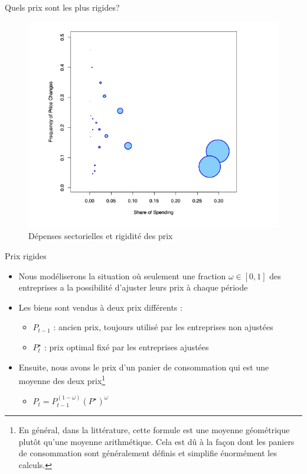 \documentclass[
  ignorenonframetext,
  aspectratio=169,
]{beamer}
\providecommand{\tightlist}{%
  \setlength{\itemsep}{0pt}\setlength{\parskip}{0pt}}\usepackage{longtable,booktabs,array}
\begin{document}
\begin{frame}{Quels prix sont les plus rigides?}
\label{quels-prix-sont-les-plus-rigides}
\begin{figure}[H]

{\centering \includegraphics[width=\textwidth,height=0.8\textheight]{assets/sectoral_spending.png}

}

\caption{Dépenses sectorielles et rigidité des prix}

\end{figure}%
\end{frame}

\begin{frame}{Prix rigides}
\label{prix-rigides-2}
\begin{itemize}
\item
  Nous modéliserons la situation où seulement une fraction
  \(\omega \in [0,1]\) des entreprises a la possibilité d'ajuster leurs
  prix à chaque période
\item
  Les biens sont vendus à deux prix différents :

  \begin{itemize}
  \tightlist
  \item
    \(P_{t-1}\) : ancien prix, toujours utilisé par les entreprises non
    ajustées
  \item
    \(P^{\star}_t\) : prix optimal fixé par les entreprises ajustées
  \end{itemize}
\item
  Ensuite, nous avons le prix d'un panier de consommation qui est une
  moyenne des deux
  prix\footnote{En général, dans la littérature, cette formule est une moyenne géométrique plutôt qu'une moyenne arithmétique. Cela est dû à la façon dont les paniers de consommation sont généralement définis et simplifie énormément les calculs.}

  \begin{itemize}
  \tightlist
  \item
    \(P_t = P_{t-1}^{(1-\omega)}(P^{\star})^{\omega}\)
  \end{itemize}
\end{itemize}
\end{frame}
\end{document}

